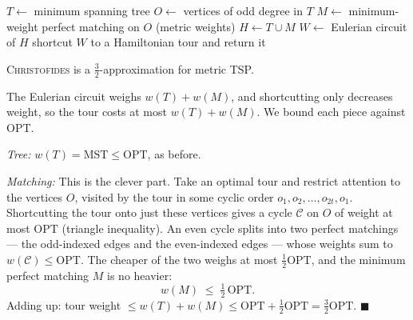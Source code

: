 \begin{algorithm}[H]
\caption{\textsc{Christofides}$(\Gph,w)$ -- metric}\label{ch38:alg-christofides}
\DontPrintSemicolon
$T \gets$ minimum spanning tree\;
$O \gets$ vertices of odd degree in $T$ 
$M \gets$ minimum-weight perfect matching on $O$ (metric weights)\;
$H \gets T \cup M$ 
$W \gets$ Eulerian circuit of $H$\;
shortcut $W$ to a Hamiltonian tour and return it\;
\end{algorithm}

\begin{theorem}\label{ch38:thm-christofides}
\textsc{Christofides} is a $\tfrac32$-approximation for metric TSP.
\end{theorem}

\begin{whybox}
The Eulerian circuit weighs $w(T)+w(M)$, and shortcutting only decreases weight, so the tour costs at
most $w(T)+w(M)$. We bound each piece against $\mathrm{OPT}$.

\emph{Tree:} $w(T)=\mathrm{MST}\le\mathrm{OPT}$, as before.

\emph{Matching:} This is the clever part. Take an optimal tour and restrict attention to the vertices
$O$, visited by the tour in some cyclic order $o_1,o_2,\dots,o_{2t},o_1$. Shortcutting the tour onto
just these vertices gives a cycle $\mathcal{C}$ on $O$ of weight at most $\mathrm{OPT}$ (triangle
inequality). An even cycle splits into two perfect matchings --- the odd-indexed edges and the
even-indexed edges --- whose weights sum to $w(\mathcal{C})\le\mathrm{OPT}$. The cheaper of the two
weighs at most $\tfrac12\mathrm{OPT}$, and the minimum perfect matching $M$ is no heavier:
\[
  w(M) \;\le\; \tfrac12\,\mathrm{OPT}.
\]
Adding up: tour weight $\le w(T)+w(M)\le \mathrm{OPT}+\tfrac12\mathrm{OPT}=\tfrac32\mathrm{OPT}$.
$\blacksquare$
\end{whybox}

